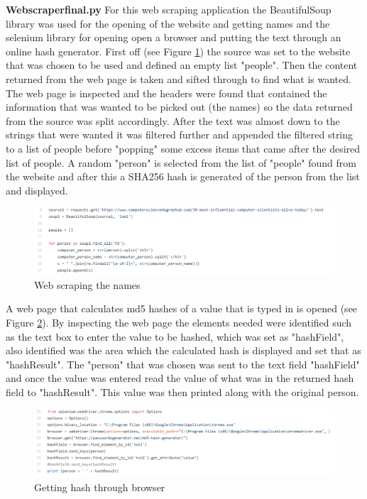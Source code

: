 \documentclass[12pt,a4paper]{article}
\begin{document}
\textbf{Web\textunderscore scraper\textunderscore final.py}  
For this web scraping application the BeautifulSoup library was used for the opening of the website and getting names and the selenium library for opening open a browser and putting the text through an online hash generator. First off (see Figure \ref{Webscrape1}) the source was set to the website that was chosen to be used and defined an empty list "people". Then the content returned from the web page is taken and sifted through to find what is wanted. The web page is inspected and the headers were found that contained the information that was wanted to be picked out (the names) so the data returned from the source was split accordingly. After the text was almost down to the strings that were wanted it was filtered further and appended the filtered string to a list of people before "popping" some excess items that came after the desired list of people. A random "person" is selected from the list of "people" found from the website and after this a SHA256 hash is generated of the person from the list and displayed. 

\begin{figure}[!ht]
    \centering
    \includegraphics[width=1.0\textwidth]{Figs/web_scrape1.PNG} 
    \caption{Web scraping the names} 
    \label{Webscrape1}
\end{figure}  

 A web page that calculates md5 hashes of a value that is typed in is opened (see Figure \ref{Webscrape2}). By inspecting the web page the elements needed were identified such as the text box to enter the value to be hashed, which was set as "hashField", also identified was the area which the calculated hash is displayed and set that as "hashResult". The "person" that was chosen was sent to the text field "hashField" and once the value was entered read the value of what was in the returned hash field to "hashResult". This value was then printed along with the original person.

\begin{figure}[!ht]
    \centering
    \includegraphics[width=1.0\textwidth]{Figs/web_scrape2.PNG} 
    \caption{Getting hash through browser} 
    \label{Webscrape2}
\end{figure} 
\end{document}
